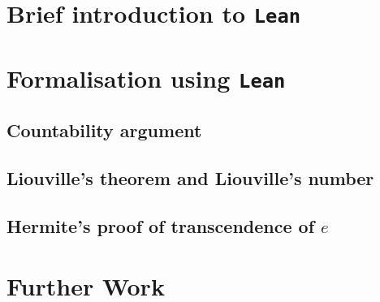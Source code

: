 \documentclass{report}
\begin{document}
\chapter{Brief introduction to {\tt Lean}}\label{intro:lean}



\chapter{Formalisation using {\tt Lean}}\label{fmlsn}
\section{Countability argument}\label{fmlsn:count}
\section{Liouville's theorem and Liouville's number}\label{fmlsn:li}
\section{Hermite's proof of transcendence of $e$}\label{fmlsn:e}

\chapter{Further Work}



\nocite{*}

\end{document}
